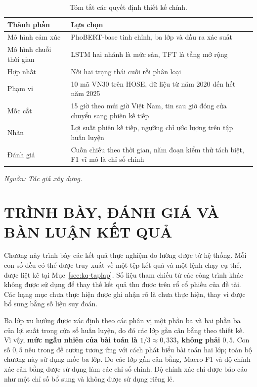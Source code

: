 \documentclass[12pt, a4paper, oneside]{report}
\begin{document}
\begin{table}[H]
  \centering
  \caption{Tóm tắt các quyết định thiết kế chính.}
  \label{tab:cau-hinh}
  \begin{tabular}{p{4cm} p{9cm}}
    \toprule
    Thành phần & Lựa chọn \\
    \midrule
    Mô hình cảm xúc & PhoBERT-base tinh chỉnh, ba lớp và đầu ra xác suất \\
    Mô hình chuỗi thời gian & LSTM hai nhánh là mức sàn, TFT là tầng mở rộng \\
    Hợp nhất & Nối hai trạng thái cuối rồi phân loại \\
    Phạm vi & 10 mã VN30 trên HOSE, dữ liệu từ năm 2020 đến hết năm 2025 \\
    Mốc cắt & 15 giờ theo múi giờ Việt Nam, tin sau giờ đóng cửa chuyển sang phiên kế tiếp \\
    Nhãn & Lợi suất phiên kế tiếp, ngưỡng chỉ ước lượng trên tập huấn luyện \\
    Đánh giá & Cuốn chiếu theo thời gian, năm đoạn kiểm thử tách biệt, F1 vĩ mô là chỉ số chính \\
    \bottomrule
  \end{tabular}
\noindent\textit{Nguồn: Tác giả xây dựng.}
\end{table}

\chapter{TRÌNH BÀY, ĐÁNH GIÁ VÀ BÀN LUẬN KẾT QUẢ}
\label{ch:ket-qua}

Chương này trình bày các kết quả thực nghiệm đo lường được từ hệ thống. Mỗi con số đều
có thể được truy xuất về một tệp kết quả và một lệnh chạy cụ thể, được liệt kê tại
Mục~\ref{sec:kq-taplap}. Số liệu tham chiếu từ các công trình khác không được sử dụng để
thay thế kết quả thu được trên rổ cổ phiếu của đề tài. Các hạng mục chưa thực hiện được
ghi nhận rõ là chưa thực hiện, thay vì được bổ sung bằng số liệu suy đoán.

Ba lớp xu hướng được xác định theo các phân vị một phần ba và hai phần ba của lợi suất
trong cửa sổ huấn luyện, do đó các lớp gần cân bằng theo thiết kế. Vì vậy,
\textbf{mức ngẫu nhiên của bài toán là $1/3 \approx 0{,}333$, không phải $0{,}5$}.
Con số $0{,}5$ nêu trong đề cương tương ứng với cách phát biểu bài toán hai lớp; toàn bộ
chương này sử dụng mốc ba lớp. Do các lớp gần cân bằng, Macro-F1 và độ chính xác cân bằng
được sử dụng làm các chỉ số chính. Độ chính xác chỉ được báo cáo như một chỉ số bổ sung
và không được sử dụng riêng lẻ.
\end{document}
